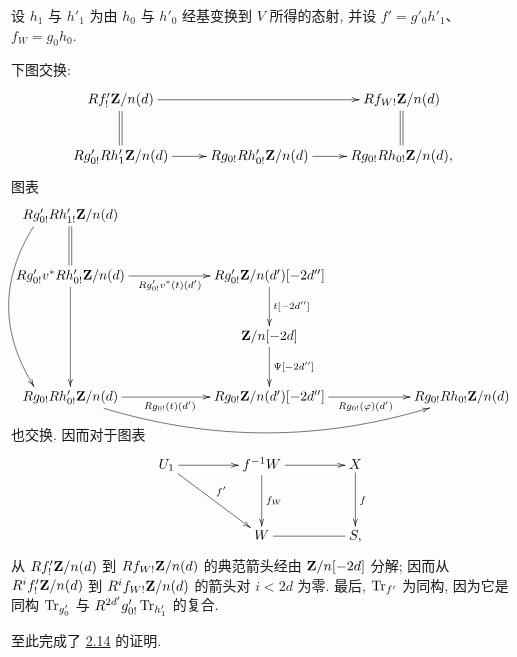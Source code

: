 设 $h_{1}$ 与 $h'_{1}$ 为由 $h_{0}$ 与 $h'_0$ 经基变换到 $V$ 所得的态射, 并设 $f'=g'_{0}h'_{1}$、$f_{W}=g_{0}h_{0}$.

下图交换:
$$
\xymatrix{
  Rf'_{!}\ZZ/n(d) \ar[rr]\ar@{=}[d] & & Rf_{W!}\ZZ/n(d) \ar@{=}[d]\\
Rg'_{0!} Rh'_1\ZZ/n(d) \ar[r]& Rg_{0!} Rh'_{0!}\ZZ/n(d) \ar[r]& Rg_{0!}
Rh_{0!}\ZZ/n(d),
}
$$
图表
$$
\xymatrix@C=2.1cm@R=1cm{
  Rg'_{0!} Rh'_{1!} \ZZ/n(d)   \ar@{=}[d] \ar@<-5ex>@/_2pc/[ddd]& &\\
Rg'_{0!} v^{\ast} Rh'_{0!} \ZZ/n(d)
 \ar[dd] \ar[r]_{Rg'_{0!}v^{\ast}(t)(d')}&
Rg'_{0!}\ZZ/n(d')[-2d''] \ar[d]^{t[-2d'']}& \\
   & \ZZ/n[-2d] \ar[d]^{\Psi[-2d'']}\\
Rg_{0!} Rh'_{0!} \ZZ/n(d) \ar[r]_{Rg_{0!}(t)(d')} \ar@/_2.2pc/[rr]& Rg_{0!}\ZZ/n(d')[-2d''] \ar[r]_{Rg_{0!}(\varphi)(d')}& Rg_{0!}Rh_{0!}\ZZ/n(d)
}
$$
也交换. 因而对于\pageoriginale 图表
$$
\xymatrix@C=1.5cm@R=1.25cm{
U_1 \ar[r]\ar[rd]^{f'} & f^{-1}W \ar[r]\ar[d]^{f_W}& X\ar[d]^{f}\\
                       &  W \ar@{-}[r]     & S,
}
$$
从 $Rf'_{!}\mathbf{Z}/n(d)$ 到 $Rf_{W!}\mathbf{Z}/n(d)$ 的典范箭头经由 $\mathbf{Z}/n[-2d]$ 分解; 因而从 $R^{i}f'_{!}\mathbf{Z}/n(d)$ 到 $R^{i}f_{W!}\mathbf{Z}/n(d)$ 的箭头对 $i<2d$ 为零. 最后, $\operatorname{Tr}_{f'}$ 为同构, 因为它是同构 $\operatorname{Tr}_{g'_{0}}$ 与 $R^{2d'}g'_{0!}\operatorname{Tr}_{h'_{1}}$ 的复合.

至此完成了 \hyperref[XVIII.thm2.14]{2.14} 的证明.


